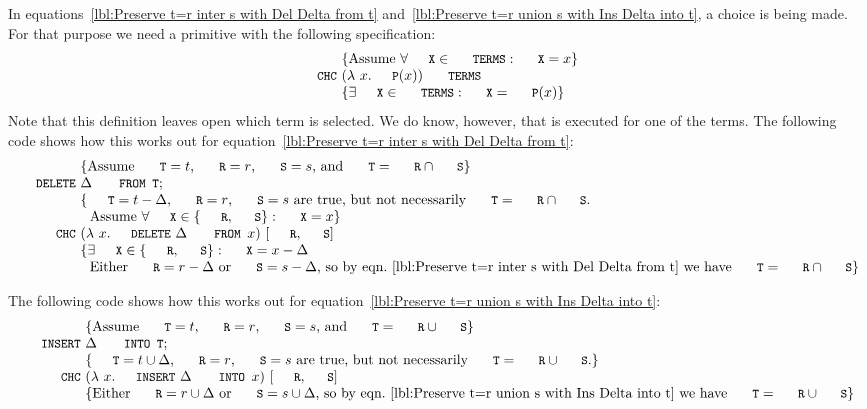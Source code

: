 \documentclass{svproc}
\begin{document}
	In equations~\ref{lbl:Preserve t=r inter s with Del Delta from t} and~\ref{lbl:Preserve t=r union s with Ins Delta into t},
	a choice is being made. For that purpose we need a primitive  with the following specification:
\[\begin{array}{r@{~}l}
&\{\text{Assume }\forall\code{X}\in\code{TERMS}:\code{X}=x\}\\
\code{CHC}&(\lambda\ x.\code{P}(x))\ \code{TERMS}\\
&\{\exists\code{X}\in\code{TERMS}:\code{X}=\code{P}(x)\}
\end{array}\]
	Note that this definition leaves open which term is selected.
	We do know, however, that  is executed for one of the terms.
	The following code shows how this works out for equation~\ref{lbl:Preserve t=r inter s with Del Delta from t}:
\[\begin{array}{r@{~}l}
&\{\text{Assume $\code{T}=t$, $\code{R}=r$, $\code{S}=s$, and $\code{T}=\code{R}\cap\code{S}$}\}\\
\code{DELETE}&\Delta\code{ FROM T};\\
&\{\text{$\code{T}=t-\Delta$, $\code{R}=r$, $\code{S}=s$ are true, but not necessarily $\code{T}=\code{R}\cap\code{S}$.}\\
&~~\text{Assume }\forall\code{X}\in\{\code{R},\code{S}\}:\code{X}=x\}\\
\code{CHC}&(\lambda\ x.\code{DELETE}\ \Delta\code{ FROM }x)\ [\code{R},\code{S}]\\
&\{\exists\code{X}\in\{\code{R},\code{S}\}:\code{X}=x-\Delta\\
&~~\text{Either }\code{R}=r-\Delta\text{ or }\code{S}=s-\Delta\text{, so by eqn.~\ref{lbl:Preserve t=r inter s with Del Delta from t} we have }\code{T}=\code{R}\cap\code{S}\}
\end{array}\]

	The following code shows how this works out for equation~\ref{lbl:Preserve t=r union s with Ins Delta into t}:
\[\begin{array}{r@{~}l}
&\{\text{Assume $\code{T}=t$, $\code{R}=r$, $\code{S}=s$, and $\code{T}=\code{R}\cup\code{S}$}\}\\
\code{INSERT}&\Delta\code{ INTO T};\\
&\{\text{$\code{T}=t\cup\Delta$, $\code{R}=r$, $\code{S}=s$ are true, but not necessarily $\code{T}=\code{R}\cup\code{S}$.}\}\\
\code{CHC}&(\lambda\ x.\code{INSERT}\ \Delta\code{ INTO }x)\ [\code{R},\code{S}]\\
&\{\text{Either }\code{R}=r\cup\Delta\text{ or }\code{S}=s\cup\Delta\text{, so by eqn.~\ref{lbl:Preserve t=r union s with Ins Delta into t} we have }\code{T}=\code{R}\cup\code{S}\}
\end{array}\]
\end{document}
